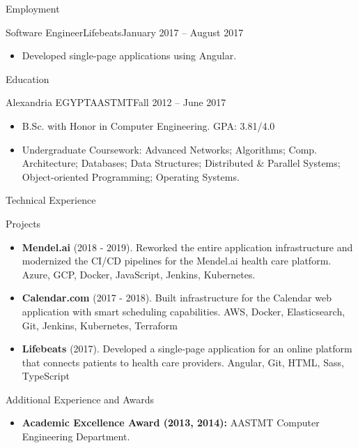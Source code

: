 \documentclass[]{mcdowellcv}
\begin{document}
\begin{cvsection}{Employment}
		\begin{cvsubsection}{Software Engineer}{Lifebeats}{January 2017 -- August 2017}
			\begin{itemize}
				\item Developed single-page applications using Angular.
			\end{itemize}
		\end{cvsubsection}
	\end{cvsection}
	
	\begin{cvsection}{Education}
		\begin{cvsubsection}{Alexandria EGYPT}{AASTMT}{Fall 2012 -- June 2017}
			\begin{itemize}
				\item B.Sc. with Honor in Computer Engineering. GPA: 3.81/4.0
				\item Undergraduate Coursework: Advanced Networks; Algorithms; Comp. Architecture; Databases; Data Structures; Distributed \& Parallel Systems; Object-oriented Programming; Operating Systems.
			\end{itemize}
		\end{cvsubsection}
	\end{cvsection}
	
	\begin{cvsection}{Technical Experience}
		\begin{cvsubsection}{Projects}{}{}
			\begin{itemize}
				\item \textbf{Mendel.ai} (2018 - 2019). Reworked the entire application infrastructure and modernized the CI/CD pipelines for the Mendel.ai health care platform. Azure, GCP, Docker, JavaScript, Jenkins, Kubernetes.
				\item \textbf{Calendar.com} (2017 - 2018). Built infrastructure for the Calendar web application with smart scheduling capabilities. AWS, Docker, Elasticsearch, Git, Jenkins, Kubernetes, Terraform
				\item \textbf{Lifebeats} (2017). Developed a single-page application for an online platform that connects patients to health care providers. Angular, Git, HTML, Sass, TypeScript
			\end{itemize}
		\end{cvsubsection}
	\end{cvsection}
	
	\begin{cvsection}{Additional Experience and Awards}
		\begin{cvsubsection}{}{}{}	
			\begin{itemize}
				\item \textbf{Academic Excellence Award (2013, 2014):} AASTMT Computer Engineering Department.
			\end{itemize}
		\end{cvsubsection}
	\end{cvsection}
	
\end{document}
